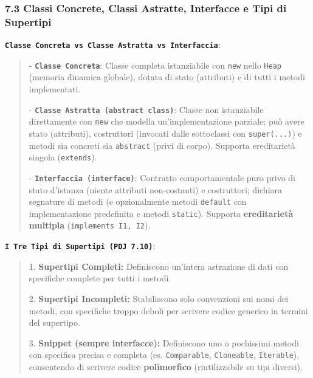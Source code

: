 \subsubsection{7.3 Classi Concrete, Classi Astratte, Interfacce e Tipi di Supertipi}\label{7-3-classi-concrete-classi-astratte-interfacce-e-tipi-di-supertipi}

\textbf{\texttt{Classe Concreta vs Classe Astratta vs Interfaccia}}:

\begin{quote}\small

- \textbf{\texttt{Classe Concreta}}: Classe completa istanziabile con \texttt{new} nello \texttt{Heap} (memoria dinamica globale), dotata di stato (attributi) e di tutti i metodi implementati.

- \textbf{\texttt{Classe Astratta (abstract class)}}: Classe non istanziabile direttamente con \texttt{new} che modella un'implementazione parziale; può avere stato (attributi), costruttori (invocati dalle sottoclassi con \texttt{super(...)}) e metodi sia concreti sia \texttt{abstract} (privi di corpo). Supporta ereditarietà singola (\texttt{extends}).

- \textbf{\texttt{Interfaccia (interface)}}: Contratto comportamentale puro privo di stato d'istanza (niente attributi non-costanti) e costruttori; dichiara segnature di metodi (e opzionalmente metodi \texttt{default} con implementazione predefinita e metodi \texttt{static}). Supporta \textbf{ereditarietà multipla} (\texttt{implements I1, I2}).

\end{quote}

\textbf{\texttt{I Tre Tipi di Supertipi (PDJ 7.10)}}:

\begin{quote}\small

1. \textbf{Supertipi Completi:} Definiscono un'intera astrazione di dati con specifiche complete per tutti i metodi.

2. \textbf{Supertipi Incompleti:} Stabiliscono solo convenzioni sui nomi dei metodi, con specifiche troppo deboli per scrivere codice generico in termini del supertipo.

3. \textbf{Snippet (sempre interfacce):} Definiscono uno o pochissimi metodi con specifica precisa e completa (es. \texttt{Comparable}, \texttt{Cloneable}, \texttt{Iterable}), consentendo di scrivere codice \textbf{polimorfico} (riutilizzabile su tipi diversi).

\end{quote}

